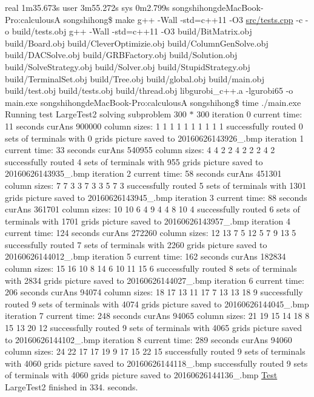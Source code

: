 real 1m35.\+673s user 3m55.\+272s sys 0m2.\+799s songshihongde\+Mac\+Book-\/\+Pro\+:calculousA songshihong\$ make g++ -\/\+Wall -\/std=c++11 -\/\+O3 \hyperlink{tests_8cpp}{src/tests.\+cpp} -\/c -\/o build/tests.\+obj g++ -\/\+Wall -\/std=c++11 -\/\+O3 build/\+Bit\+Matrix.\+obj build/\+Board.\+obj build/\+Clever\+Optimizie.\+obj build/\+Column\+Gen\+Solve.\+obj build/\+D\+A\+C\+Solve.\+obj build/\+G\+R\+B\+Factory.\+obj build/\+Solution.\+obj build/\+Solve\+Strategy.\+obj build/\+Solver.\+obj build/\+Stupid\+Strategy.\+obj build/\+Terminal\+Set.\+obj build/\+Tree.\+obj build/global.\+obj build/main.\+obj build/test.\+obj build/tests.\+obj build/thread.\+obj libgurobi\+\_\+c++.a -\/lgurobi65 -\/o main.\+exe songshihongde\+Mac\+Book-\/\+Pro\+:calculousA songshihong\$ time ./main.exe Running test Large\+Test2 solving subproblem 300 $\ast$ 300 iteration 0 current time\+: 11 seconds cur\+Ans 900000 column sizes\+: 1 1 1 1 1 1 1 1 1 1 successfully routed 0 sets of terminals with 0 grids picture saved to 20160626143926\+\_.\+bmp iteration 1 current time\+: 33 seconds cur\+Ans 540955 column sizes\+: 4 4 2 2 4 2 2 2 4 2 successfully routed 4 sets of terminals with 955 grids picture saved to 20160626143935\+\_.\+bmp iteration 2 current time\+: 58 seconds cur\+Ans 451301 column sizes\+: 7 7 3 3 7 3 3 5 7 3 successfully routed 5 sets of terminals with 1301 grids picture saved to 20160626143945\+\_.\+bmp iteration 3 current time\+: 88 seconds cur\+Ans 361701 column sizes\+: 10 10 6 4 9 4 4 8 10 4 successfully routed 6 sets of terminals with 1701 grids picture saved to 20160626143957\+\_.\+bmp iteration 4 current time\+: 124 seconds cur\+Ans 272260 column sizes\+: 12 13 7 5 12 5 7 9 13 5 successfully routed 7 sets of terminals with 2260 grids picture saved to 20160626144012\+\_.\+bmp iteration 5 current time\+: 162 seconds cur\+Ans 182834 column sizes\+: 15 16 10 8 14 6 10 11 15 6 successfully routed 8 sets of terminals with 2834 grids picture saved to 20160626144027\+\_.\+bmp iteration 6 current time\+: 206 seconds cur\+Ans 94074 column sizes\+: 18 17 13 11 17 7 13 13 18 9 successfully routed 9 sets of terminals with 4074 grids picture saved to 20160626144045\+\_.\+bmp iteration 7 current time\+: 248 seconds cur\+Ans 94065 column sizes\+: 21 19 15 14 18 8 15 13 20 12 successfully routed 9 sets of terminals with 4065 grids picture saved to 20160626144102\+\_.\+bmp iteration 8 current time\+: 289 seconds cur\+Ans 94060 column sizes\+: 24 22 17 17 19 9 17 15 22 15 successfully routed 9 sets of terminals with 4060 grids picture saved to 20160626144118\+\_.\+bmp successfully routed 9 sets of terminals with 4060 grids picture saved to 20160626144136\+\_.\+bmp \hyperlink{classTest}{Test} Large\+Test2 finished in 334. seconds.

